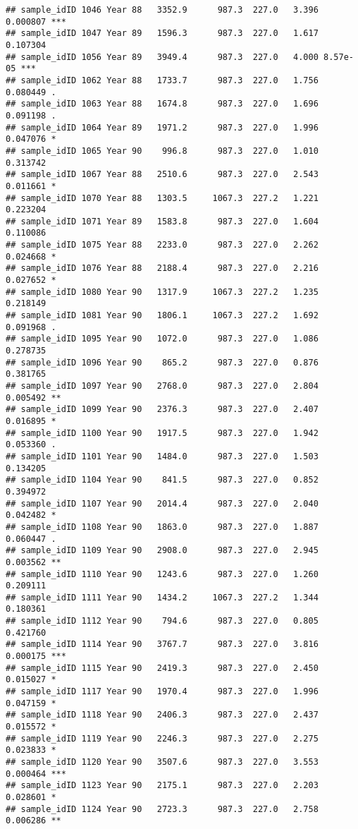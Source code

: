 \documentclass[
]{article}
\begin{document}
\begin{verbatim}
## sample_idID 1046 Year 88   3352.9      987.3  227.0   3.396 0.000807 ***
## sample_idID 1047 Year 89   1596.3      987.3  227.0   1.617 0.107304    
## sample_idID 1056 Year 89   3949.4      987.3  227.0   4.000 8.57e-05 ***
## sample_idID 1062 Year 88   1733.7      987.3  227.0   1.756 0.080449 .  
## sample_idID 1063 Year 88   1674.8      987.3  227.0   1.696 0.091198 .  
## sample_idID 1064 Year 89   1971.2      987.3  227.0   1.996 0.047076 *  
## sample_idID 1065 Year 90    996.8      987.3  227.0   1.010 0.313742    
## sample_idID 1067 Year 88   2510.6      987.3  227.0   2.543 0.011661 *  
## sample_idID 1070 Year 88   1303.5     1067.3  227.2   1.221 0.223204    
## sample_idID 1071 Year 89   1583.8      987.3  227.0   1.604 0.110086    
## sample_idID 1075 Year 88   2233.0      987.3  227.0   2.262 0.024668 *  
## sample_idID 1076 Year 88   2188.4      987.3  227.0   2.216 0.027652 *  
## sample_idID 1080 Year 90   1317.9     1067.3  227.2   1.235 0.218149    
## sample_idID 1081 Year 90   1806.1     1067.3  227.2   1.692 0.091968 .  
## sample_idID 1095 Year 90   1072.0      987.3  227.0   1.086 0.278735    
## sample_idID 1096 Year 90    865.2      987.3  227.0   0.876 0.381765    
## sample_idID 1097 Year 90   2768.0      987.3  227.0   2.804 0.005492 ** 
## sample_idID 1099 Year 90   2376.3      987.3  227.0   2.407 0.016895 *  
## sample_idID 1100 Year 90   1917.5      987.3  227.0   1.942 0.053360 .  
## sample_idID 1101 Year 90   1484.0      987.3  227.0   1.503 0.134205    
## sample_idID 1104 Year 90    841.5      987.3  227.0   0.852 0.394972    
## sample_idID 1107 Year 90   2014.4      987.3  227.0   2.040 0.042482 *  
## sample_idID 1108 Year 90   1863.0      987.3  227.0   1.887 0.060447 .  
## sample_idID 1109 Year 90   2908.0      987.3  227.0   2.945 0.003562 ** 
## sample_idID 1110 Year 90   1243.6      987.3  227.0   1.260 0.209111    
## sample_idID 1111 Year 90   1434.2     1067.3  227.2   1.344 0.180361    
## sample_idID 1112 Year 90    794.6      987.3  227.0   0.805 0.421760    
## sample_idID 1114 Year 90   3767.7      987.3  227.0   3.816 0.000175 ***
## sample_idID 1115 Year 90   2419.3      987.3  227.0   2.450 0.015027 *  
## sample_idID 1117 Year 90   1970.4      987.3  227.0   1.996 0.047159 *  
## sample_idID 1118 Year 90   2406.3      987.3  227.0   2.437 0.015572 *  
## sample_idID 1119 Year 90   2246.3      987.3  227.0   2.275 0.023833 *  
## sample_idID 1120 Year 90   3507.6      987.3  227.0   3.553 0.000464 ***
## sample_idID 1123 Year 90   2175.1      987.3  227.0   2.203 0.028601 *  
## sample_idID 1124 Year 90   2723.3      987.3  227.0   2.758 0.006286 ** 

\end{verbatim}
\end{document}
